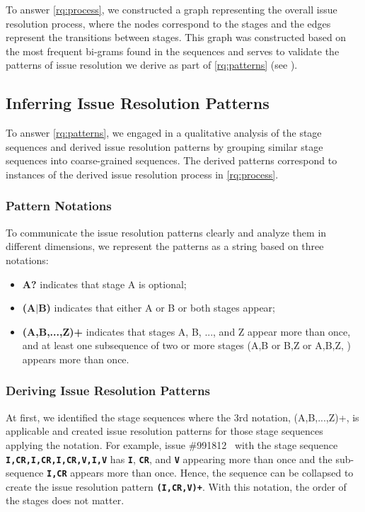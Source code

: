 To answer \ref{rq:process}, we constructed a graph representing the overall issue resolution process, where the nodes correspond to the stages and the edges represent the transitions between stages. This graph was constructed based on the most frequent bi-grams found in the sequences and serves to validate the patterns of issue resolution we derive as part of \ref{rq:patterns} (see ). 


\subsection{Inferring Issue Resolution Patterns}
\label{sub:resolution_patterns}
To answer \ref{rq:patterns}, we engaged in a qualitative analysis of the stage sequences and derived issue resolution patterns by grouping similar stage sequences into coarse-grained sequences. The derived patterns correspond to instances of the derived issue resolution process in \ref{rq:process}.

\subsubsection{\textbf{Pattern Notations}} To communicate the issue resolution patterns clearly and analyze them in different dimensions, we represent the patterns as a string based on  three  notations: 
\begin{itemize}
    \item \textbf{A?}  indicates that stage A is optional;
    \item \textbf{(A$\mid$B)} indicates that either A or B or both stages appear; 
    \item \textbf{(A,B,...,Z)+} indicates that stages A, B, ..., and Z appear more than once, and at least one subsequence of two or more stages (A,B or B,Z or A,B,Z, \etc) appears more than once.
\end{itemize}




\subsubsection{\textbf{Deriving Issue Resolution Patterns}} At first, we identified the stage sequences where the 3rd notation, (A,B,...,Z)+, is applicable and created issue resolution patterns for those stage sequences applying the notation. For example, issue \#991812~\cite{firefox-bug-991812} with the stage sequence \texttt{\textbf{I,CR,I,CR,I,CR,V,I,V}} has \texttt{\textbf{I}}, \texttt{\textbf{CR}}, and \texttt{\textbf{V}} appearing more than once and the sub-sequence \texttt{\textbf{I,CR}} appears more than once. Hence, the sequence can be collapsed to create the issue resolution pattern \texttt{\textbf{(I,CR,V)+}}. With this notation, the order of the stages does not matter.

